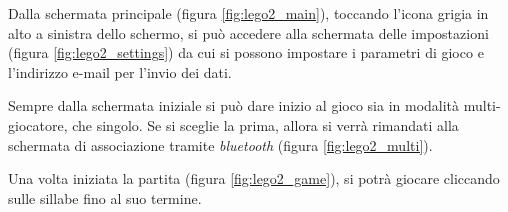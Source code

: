 
Dalla schermata principale (figura \ref{fig:lego2_main}), toccando l'icona grigia in alto a sinistra dello schermo, si può accedere alla schermata delle impostazioni (figura \ref{fig:lego2_settings}) da cui si possono impostare i parametri di gioco e l'indirizzo e-mail per l'invio dei dati.


Sempre dalla schermata iniziale si può dare inizio al gioco sia in modalità multi-giocatore, che singolo. Se si sceglie la prima, allora si verrà rimandati alla schermata di associazione tramite \textit{bluetooth} (figura \ref{fig:lego2_multi}).


Una volta iniziata la partita (figura \ref{fig:lego2_game}), si potrà giocare cliccando sulle sillabe fino al suo termine.

